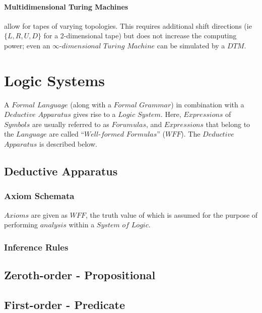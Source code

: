 \documentclass{article}
\begin{document}
\paragraph{Multidimensional Turing Machines} allow for tapes of
varying topologies. This requires additional shift directions (ie
$\{L, R, U, D\}$ for a 2-dimensional tape) but does not increase the
computing power; even an $\infty$-$dimensional$ $Turing$ $Machine$ can
be simulated by a $DTM$.


\section{Logic Systems}

A $Formal$ $Language$ (along with a $Formal$ $Grammar$) in combination
with a $Deductive$ $Apparatus$ gives rise to a $Logic$ $System$. Here,
$Expressions$ of $Symbols$ are usually referred to as $Forumulas$, and
$Expressions$ that belong to the $Language$ are called
``$Well$-$formed$ $Formulas$'' ($WFF$). The $Deductive$ $Apparatus$ is
described below.

\subsection{Deductive Apparatus}

\subsubsection{Axiom Schemata}

$Axioms$ are given as $WFF$, the truth value of which is
assumed for the purpose of performing $analysis$ within a $System$
$of$ $Logic$.



\subsubsection{Inference Rules}

\subsection{Zeroth-order - Propositional}

\subsection{First-order - Predicate}
\end{document}
